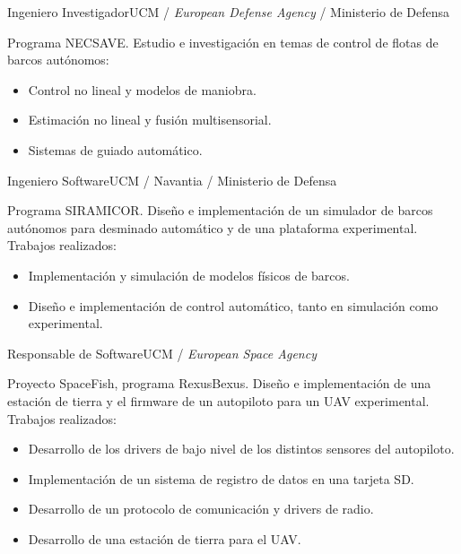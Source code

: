 \documentclass[11pt,a4paper,sans]{moderncv}
\begin{document}
    {Ingeniero Investigador}{UCM / \emph{European Defense Agency} / Ministerio de Defensa}{}{}{
    Programa NECSAVE.\newline{}%
    Estudio e investigación en temas de control de flotas de barcos autónomos:%
    \begin{itemize}%
        \item Control no lineal y modelos de maniobra.
        \item Estimación no lineal y fusión multisensorial.
        \item Sistemas de guiado automático.
    \end{itemize}}

    {Ingeniero Software}{UCM / Navantia / Ministerio de Defensa}{}{}{
    Programa SIRAMICOR.\newline{}%
    Diseño e implementación de un simulador de barcos autónomos para desminado automático y de una
    plataforma experimental.\newline{}%
    Trabajos realizados:%
    \begin{itemize}%
        \item Implementación y simulación de modelos físicos de barcos.
        \item Diseño e implementación de control automático, tanto en simulación como experimental.
    \end{itemize}}

    {Responsable de Software}{UCM / \emph{European Space Agency}}{}{}{
    Proyecto SpaceFish, programa RexusBexus.\newline{}%
    Diseño e implementación de una estación de tierra y el firmware de un autopiloto para un UAV
    experimental.\newline{}%
    Trabajos realizados:%
    \begin{itemize}%
        \item Desarrollo de los drivers de bajo nivel de los distintos sensores del autopiloto.
        \item Implementación de un sistema de registro de datos en una tarjeta SD.
        \item Desarrollo de un protocolo de comunicación y drivers de radio.
        \item Desarrollo de una estación de tierra para el UAV.
    \end{itemize}}
\end{document}

